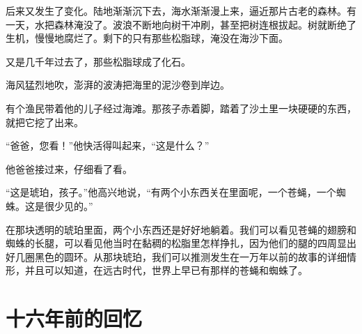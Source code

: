 \documentclass[12pt,UTF-8,openany]{ctexbook}
\begin{document}
\begin{large}
    后来又发生了变化。陆地渐渐沉下去，海水渐渐漫上来，逼近那片古老的森林。有一天，水把森林淹没了。波浪不断地向树干冲刷，甚至把树连根拔起。树就断绝了生机，慢慢地腐烂了。剩下的只有那些松脂球，淹没在海沙下面。
    
    又是几千年过去了，那些松脂球成了化石。
    
    海风猛烈地吹，澎湃的波涛把海里的泥沙卷到岸边。
    
    有个渔民带着他的儿子经过海滩。那孩子赤着脚，踏着了沙土里一块硬硬的东西，就把它挖了出来。
    
    “爸爸，您看！”他快活得叫起来，“这是什么？”
    
    他爸爸接过来，仔细看了看。
    
    “这是琥珀，孩子。”他高兴地说，“有两个小东西关在里面呢，一个苍蝇，一个蜘蛛。这是很少见的。”
    
    在那块透明的琥珀里面，两个小东西还是好好地躺着。我们可以看见苍蝇的翅膀和蜘蛛的长腿，可以看见他当时在黏稠的松脂里怎样挣扎，因为他们的腿的四周显出好几圈黑色的圆环。从那块琥珀，我们可以推测发生在一万年以前的故事的详细情形，并且可以知道，在远古时代，世界上早已有那样的苍蝇和蜘蛛了。
    
\end{large}



\chapter{十六年前的回忆}
\end{document}
